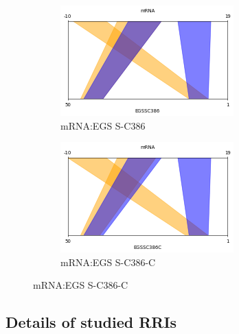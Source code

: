 \documentclass[twoside,a4paper]{report}
\begin{document}
	 \begin{figure}[h!tb]
	 	\centering
	 \begin{subfigure}{.5\textwidth}
	 	\centering
	 	\includegraphics[width=.9\linewidth]{egs(e)}
	 	\caption{mRNA:EGS S-C386}
	 	\label{fig:egs(e)}
	 \end{subfigure}%
	 \begin{subfigure}{.5\textwidth}
	 	\centering
	 	\includegraphics[width=.9\linewidth]{egs(f)}
	 	\caption{mRNA:EGS S-C386-C}
	 	\label{fig:egs(f)}
	 \end{subfigure}
 \end{figure}
\clearpage	


\subsection{Details of studied RRIs}
\end{document}
